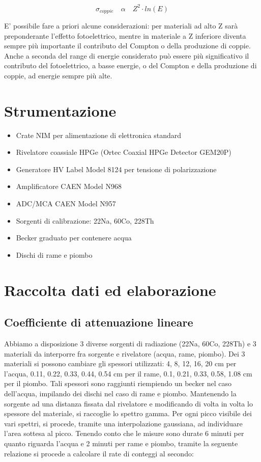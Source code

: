 \documentclass[a4paper,10pt]{article}
\begin{document}
\begin{equation}
	\sigma_{coppie}\quad  \alpha \quad  Z^2 \cdot ln(E)
\end{equation}

E' possibile fare a priori alcune considerazioni: per materiali ad alto Z sarà preponderante l'effetto fotoelettrico, mentre in materiale a Z inferiore diventa sempre più importante il contributo del Compton o della produzione di coppie. Anche a seconda del range di energie considerato può essere più significativo il contributo del fotoelettrico, a basse energie, o del Compton e della produzione di coppie, ad energie sempre più alte.


\section{Strumentazione}
\begin{itemize}
\item Crate NIM per alimentazione di elettronica standard
\item Rivelatore coassiale HPGe (Ortec Coaxial HPGe Detector GEM20P)
\item Generatore HV Label Model 8124 per tensione di polarizzazione
\item Amplificatore CAEN Model N968
\item ADC/MCA CAEN Model N957
\item Sorgenti di calibrazione: 22Na, 60Co, 228Th
\item Becker graduato per contenere acqua
\item Dischi di rame e piombo
\end{itemize}


\section{Raccolta dati ed elaborazione}
\subsection{Coefficiente di attenuazione lineare}
Abbiamo a disposizione 3 diverse sorgenti di radiazione (22Na, 60Co, 228Th) e 3 materiali da interporre fra sorgente e rivelatore (acqua, rame, piombo). Dei 3 materiali si possono cambiare gli spessori utilizzati: 4, 8, 12, 16, 20 cm per l'acqua, 0.11, 0.22, 0.33, 0.44, 0.54 cm per il rame, 0.1, 0.21, 0.33, 0.58, 1.08 cm per il piombo. Tali spessori sono raggiunti riempiendo un becker nel caso dell'acqua, impilando dei dischi nel caso di rame e piombo. Mantenendo la sorgente ad una distanza fissata dal rivelatore e modificando di volta in volta lo spessore del materiale, si raccoglie lo spettro gamma. Per ogni picco visibile dei vari spettri, si procede, tramite una interpolazione gaussiana, ad individuare l'area sottesa al picco. Tenendo conto che le misure sono durate 6 minuti per quanto riguarda l'acqua e 2 minuti per rame e piombo, tramite la seguente relazione si procede a calcolare il rate di conteggi al secondo:
\end{document}
